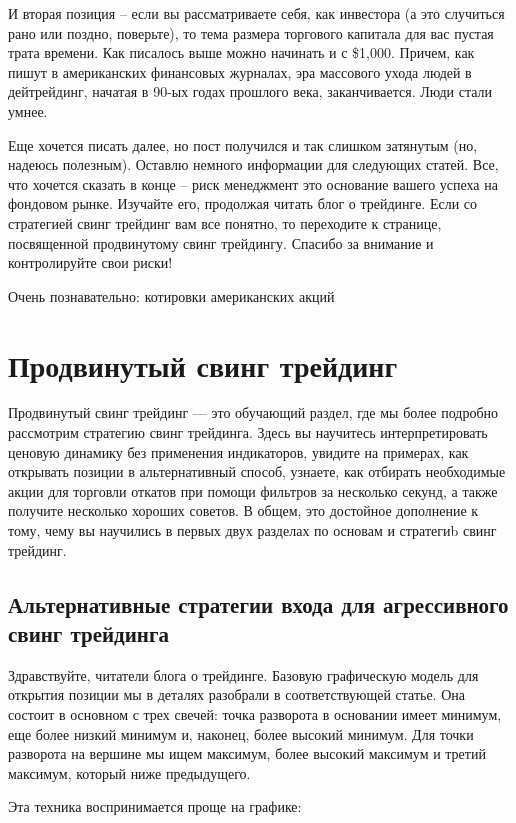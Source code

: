 \documentclass{book}
\begin{document}
И вторая позиция – если вы рассматриваете себя, как инвестора (а это случиться рано или поздно, поверьте), то тема размера торгового капитала для вас пустая трата времени. Как писалось выше можно начинать и с \$1,000. Причем, как пишут в американских финансовых журналах, эра массового ухода людей в дейтрейдинг, начатая в 90-ых годах прошлого века, заканчивается. Люди стали умнее.

Еще хочется писать далее, но пост получился и так слишком затянутым (но, надеюсь полезным). Оставлю немного информации для следующих статей. Все, что хочется сказать в конце – риск менеджмент это основание вашего успеха на фондовом рынке. Изучайте его, продолжая читать блог о трейдинге. Если со стратегией свинг трейдинг вам все понятно, то переходите к странице, посвященной продвинутому свинг трейдингу. Спасибо за внимание и контролируйте свои риски!


Очень познавательно: котировки американских акций

\section{Продвинутый свинг трейдинг}

Продвинутый свинг трейдинг — это обучающий раздел, где мы более
подробно рассмотрим стратегию свинг трейдинга. Здесь вы научитесь
интерпретировать ценовую динамику без применения индикаторов, увидите
на примерах, как открывать позиции в альтернативный способ, узнаете,
как отбирать необходимые акции для торговли откатов при помощи
фильтров за несколько секунд, а также получите несколько хороших
советов. В общем, это достойное дополнение к тому, чему вы научились в
первых двух разделах по основам и стратегиb свинг трейдинг.

\subsection{Альтернативные стратегии входа для агрессивного свинг
  трейдинга}

Здравствуйте, читатели блога о трейдинге. Базовую графическую модель для открытия позиции мы в деталях разобрали в соответствующей статье. Она состоит в основном с трех свечей: точка разворота в основании имеет минимум, еще более низкий минимум и, наконец, более высокий минимум. Для точки разворота на вершине мы ищем максимум, более высокий максимум и третий максимум, который ниже предыдущего.

Эта техника воспринимается проще на графике:
\end{document}
